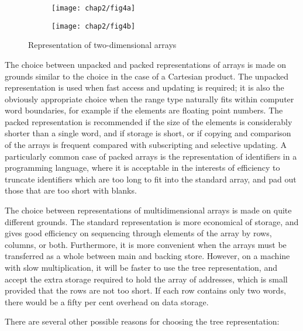 \begin{figure}[h]
	\centering
	\begin{subfigure}[b]{0.35\textwidth}
		\centering
		\texttt{[image: chap2/fig4a]}
		\caption{}
	\end{subfigure}	
	\begin{subfigure}[b]{0.6\textwidth}
		\centering
		\texttt{[image: chap2/fig4b]}
		\caption{}
	\end{subfigure}	
	\caption{Representation of two-dimensional arrays}
\end{figure}

The choice between unpacked and packed representations of arrays is made on grounds similar to the choice in the case of a Cartesian product. The unpacked representation is used when fast access and updating is required; it is also the obviously appropriate choice when the range type naturally fits within computer word boundaries, for example if the elements are floating point numbers. The packed representation is recommended if the size of the elements is considerably shorter than a single word, and if storage is short, or if copying and comparison of the arrays is frequent compared with subscripting and selective updating. A particularly common case of packed arrays is the representation of identifiers in a programming language, where it is acceptable in the interests of efficiency to truncate identifiers which are too long to fit into the standard array, and pad out those that are too short with blanks.

The choice between representations of multidimensional arrays is made on quite different grounds. The standard representation is more economical of storage, and gives good efficiency on sequencing through elements of the array by rows, columns, or both. Furthermore, it is more convenient when the arrays must be transferred as a whole between main and backing store. However, on a machine with slow multiplication, it will be faster to use the tree representation, and accept the extra storage required to hold the array of addresses, which is small provided that the rows are not too short. If each row contains only two words, there would be a fifty per cent overhead on data storage.

There are several other possible reasons for choosing the tree representation:

